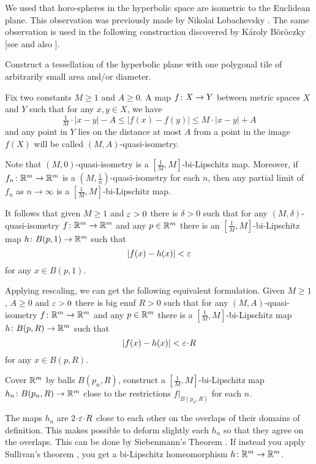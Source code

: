We used that horo-spheres in the hyperbolic space are isometric to the Euclidean plane.
This observation was previously made by Nikolai Lobachevsky \cite[see 34 in][]{lobachevsky}.
The same observation is used in the following construction discovered by 
K\'{a}roly B\"{o}r\"{o}czky [see  and also ]. 

\begin{pr}
Construct a tessellation of the hyperbolic plane with one polygonal tile of arbitrarily small area and/or diameter.  
\end{pr}

Fix two constants $M\ge 1$ and $A\ge 0$.
A map $f\:X\z\to Y$ between metric spaces $X$ and $Y$ such that for any $x,y\in X$,
 we have
\[\tfrac1M\cdot |x-y|-A\le |f(x)-f(y)|\le M\cdot |x-y|+A\]
and any point in $Y$ lies on the distance at most $A$ from a point in the image $f(X)$
will be called $(M,A)$-quasi-isometry.

{\sloppy
Note that $(M,0)$-quasi-isometry is a $[\tfrac1M,M]$-bi-Lipschitz map.
Moreover,
if $f_n\colon\mathbb{R}^m\to\mathbb{R}^m$ is a  $(M,\frac1n)$-quasi-isometry 
for each $n$, 
then any partial limit of $f_n$ as $n\to\infty$
is a $[\tfrac1M,M]$-bi-Lipschitz map.

}

It follows that given $M\ge 1$ and $\varepsilon>0$ there is $\delta>0$ such that 
for any $(M,\delta)$-quasi-isometry $f\colon\mathbb{R}^m\to\mathbb{R}^m$ and any $p\in \mathbb{R}^m$
there is an $[\tfrac1M,M]$-bi-Lipschitz map $h\colon B(p,1)\to \mathbb{R}^m$
such that
\[|f(x)-h(x)|<\varepsilon\]
for any $x\in B(p,1)$.

Applying rescaling, we can get the following equivalent formulation. 
Given $M\ge 1$, $A\ge 0$ and $\varepsilon>0$
there is big enuf $R>0$ such that for any $(M,A)$-quasi-isometry 
$f\colon\mathbb{R}^m\to\mathbb{R}^m$ and any $p\in\mathbb{R}^m$ there is a $[\tfrac1M,M]$-bi-Lipschitz map $h\colon B(p,R)\to \mathbb{R}^m$
such that 
\[|f(x)-h(x)|<\eps\cdot R\]
for any $x\in B(p,R)$.

Cover $\mathbb{R}^m$ by balls
$B(p_n,R)$, construct a $[\tfrac1M,M]$-bi-Lipschitz map $h_n\colon B(p_n,R)\to \mathbb{R}^m$ close to the restrictions $f|_{B(p_n,R)}$ for each $n$.

The maps $h_n$ are $2\cdot \eps\cdot R$ close to each other on the overlaps of their domains of definition.
This makes possible to deform slightly each $h_n$ so that they agree on the overlaps.
This can be done by Siebenmann's Theorem \cite[see][]{siebenmann}.
If instead you apply Sullivan's theorem \cite[see][]{sullivan}, you get a bi-Lipschitz homeomorphism $h\:\RR^m\z\to\RR^m$.\qeds


